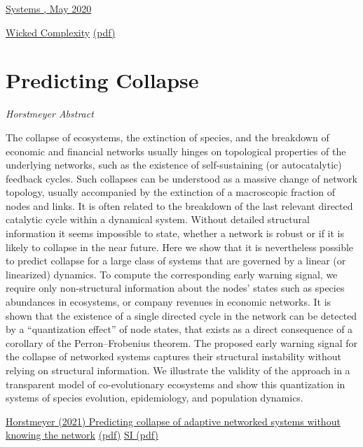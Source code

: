 \documentclass[
]{book}
\begin{document}
\href{https://www.mdpi.com/2079-8954/8/2/20?fbclid=IwAR1igNno1GlBpk86GkroiSCJuAZV_JnkPwwuzz5SmFTXINdRzX3nltifV1c}{Systems , May 2020}

\href{https://mahb.stanford.edu/blog/thresholds-cascades-and-wicked-problems/}{Wicked Complexity}
\href{pdf/Weyler_2020_Wicked_Problems.pdf}{(pdf)}

\hypertarget{predicting-collapse}{%
\section{Predicting Collapse}\label{predicting-collapse}}

\emph{Horstmeyer Abstract}

The collapse of ecosystems, the extinction of species, and the breakdown of economic and financial networks usually hinges on topological properties of the underlying networks, such as the existence of self-sustaining (or autocatalytic) feedback cycles. Such collapses can be understood as a massive change of network topology, usually accompanied by the extinction of a macroscopic fraction of nodes and links. It is often related to the breakdown of the last relevant directed catalytic cycle within a dynamical system. Without detailed structural information it seems impossible to state, whether a network is robust or if it is likely to collapse in the near future. Here we show that it is nevertheless possible to predict collapse for a large class of systems that are governed by a linear (or linearized) dynamics. To compute the corresponding early warning signal, we require only non-structural information about the nodes' states such as species abundances in ecosystems, or company revenues in economic networks. It is shown that the existence of a single directed cycle in the network can be detected by a ``quantization effect'' of node states, that exists as a direct consequence of a corollary of the Perron--Frobenius theorem. The proposed early warning signal for the collapse of networked systems captures their structural instability without relying on structural information. We illustrate the validity of the approach in a transparent model of co-evolutionary ecosystems and show this quantization in systems of species evolution, epidemiology, and population dynamics.

\href{https://www.nature.com/articles/s41598-020-57751-y}{Horstmeyer (2021) Predicting collapse of adaptive networked systems without knowing the network}
\href{pdf/Horstmeyer_2021_Predicting_Collapse.pdf}{(pdf)}
\href{pdf/Horstmeyer_2021_Predicting_Collapse_SI.pdf}{SI (pdf)}
\end{document}
